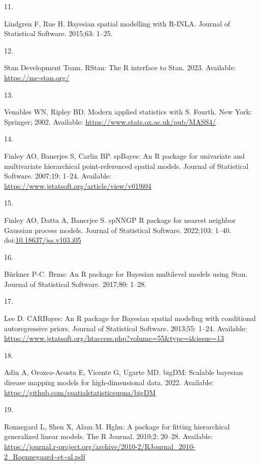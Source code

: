 \documentclass[10pt,letterpaper]{article}
\newlength{\cslhangindent}
\newlength{\csllabelwidth}
\newlength{\cslentryspacingunit} %
\newenvironment{CSLReferences}[2] %
 {%
  \setlength{\parindent}{0pt}
  \ifodd #1
  \let\oldpar\par
  \def\par{\hangindent=\cslhangindent\oldpar}
  \fi
  \setlength{\parskip}{#2\cslentryspacingunit}
 }%
 {}
\newcommand{\CSLLeftMargin}[1]{\parbox[t]{\csllabelwidth}{#1}}
\newcommand{\CSLRightInline}[1]{\parbox[t]{\linewidth - \csllabelwidth}{#1}\break}
\begin{document}
\begin{CSLReferences}{0}{0}
\leavevmode\hypertarget{ref-lindgren2015bayesian}{}%
\CSLLeftMargin{11. }
\CSLRightInline{Lindgren F, Rue H. Bayesian spatial modelling with
{R-INLA}. Journal of Statistical Software. 2015;63: 1--25. }

\leavevmode\hypertarget{ref-rstan2023rstan}{}%
\CSLLeftMargin{12. }
\CSLRightInline{Stan Development Team. {RStan}: The {R} interface to
{Stan}. 2023. Available: \url{https://mc-stan.org/}}

\leavevmode\hypertarget{ref-venables2002S}{}%
\CSLLeftMargin{13. }
\CSLRightInline{Venables WN, Ripley BD. Modern applied statistics with
{S}. Fourth. New York: Springer; 2002. Available:
\url{https://www.stats.ox.ac.uk/pub/MASS4/}}

\leavevmode\hypertarget{ref-finley2007spbayes}{}%
\CSLLeftMargin{14. }
\CSLRightInline{Finley AO, Banerjee S, Carlin BP. {spBayes}: An {R}
package for univariate and multivariate hierarchical point-referenced
spatial models. Journal of Statistical Software. 2007;19: 1--24.
Available: \url{https://www.jstatsoft.org/article/view/v019i04}}

\leavevmode\hypertarget{ref-finley2002spnngp}{}%
\CSLLeftMargin{15. }
\CSLRightInline{Finley AO, Datta A, Banerjee S. {spNNGP} {R} package for
nearest neighbor {G}aussian process models. Journal of Statistical
Software. 2022;103: 1--40.
doi:\href{https://doi.org/10.18637/jss.v103.i05}{10.18637/jss.v103.i05}}

\leavevmode\hypertarget{ref-burkner2017brms}{}%
\CSLLeftMargin{16. }
\CSLRightInline{Bürkner P-C. Brms: An {R} package for {Bayesian}
multilevel models using {Stan}. Journal of Statistical Software.
2017;80: 1--28. }

\leavevmode\hypertarget{ref-lee2013carbayes}{}%
\CSLLeftMargin{17. }
\CSLRightInline{Lee D. {CARBayes}: An {R} package for {B}ayesian spatial
modeling with conditional autoregressive priors. Journal of Statistical
Software. 2013;55: 1--24. Available:
\url{https://www.jstatsoft.org/htaccess.php?volume=55\&type=i\&issue=13}}

\leavevmode\hypertarget{ref-adin2022bigdm}{}%
\CSLLeftMargin{18. }
\CSLRightInline{Adin A, Orozco-Acosta E, Vicente G, Ugarte MD. bigDM:
Scalable bayesian disease mapping models for high-dimensional data.
2022. Available: \url{https://github.com/spatialstatisticsupna/bigDM}}

\leavevmode\hypertarget{ref-ronnegard2010hglm}{}%
\CSLLeftMargin{19. }
\CSLRightInline{Ronnegard L, Shen X, Alam M. Hglm: A package for fitting
hierarchical generalized linear models. The R Journal. 2010;2: 20--28.
Available:
\url{https://journal.r-project.org/archive/2010-2/RJournal_2010-2_Roennegaard~et~al.pdf}}


\end{CSLReferences}
\end{document}

